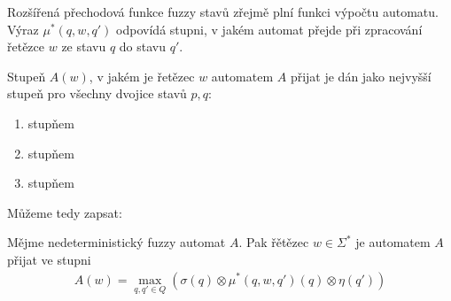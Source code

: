 \documentclass[a4paper,10pt]{article}
\begin{document}
Rozšířená přechodová funkce fuzzy stavů zřejmě plní funkci výpočtu automatu. Výraz $\mu^*(q, w, q')$ odpovídá stupni, v jakém automat přejde při zpracování řetězce $w$ ze stavu $q$ do stavu $q'$. 

Stupeň $A(w)$, v jakém je řetězec $w$ automatem $A$ přijat je dán jako nejvyšší stupeň pro všechny dvojice stavů $p, q$:
\begin{enumerate}
 \item stupňem 
 \item stupňem 
 \item stupňem 
\end{enumerate}

Můžeme tedy zapsat:

\begin{definition}\label{def-RetPriAut}
 Mějme nedeterministický fuzzy automat $A$. Pak řětězec $w \in \Sigma^*$ je automatem $A$ přijat ve stupni
 \begin{align} \label{eq-RetPriAut}
  A(w) = \max_{q, q' \in Q} (\sigma(q) \otimes \mu^*(q, w, q')(q) \otimes \eta(q'))
 \end{align}
\end{definition}
\end{document}
